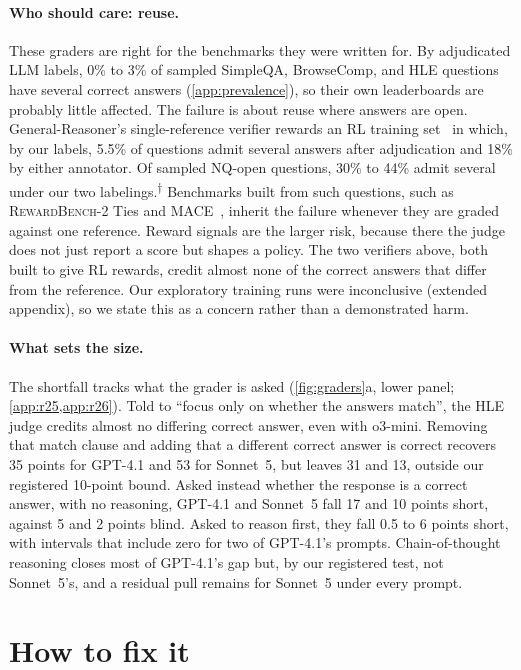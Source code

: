 \documentclass{article}
\newcommand{\ph}{\textsuperscript{$\dagger$}}
\begin{document}
\paragraph{Who should care: reuse.}
These graders are right for the benchmarks they were written for.
By adjudicated LLM labels, 0\% to 3\% of sampled SimpleQA, BrowseComp, and HLE questions have several correct answers (\cref{app:prevalence}), so their own leaderboards are probably little affected.
The failure is about reuse where answers are open.
General-Reasoner's single-reference verifier rewards an RL training set~\citep{ma2025generalreasoner} in which, by our labels, 5.5\% of questions admit several answers after adjudication and 18\% by either annotator.
Of sampled NQ-open questions, 30\% to 44\% admit several under our two labelings.\ph{}
Benchmarks built from such questions, such as \textsc{RewardBench-2} Ties and \textsc{MACE}~\citep{malik2025rewardbench2,mace2026}, inherit the failure whenever they are graded against one reference.
Reward signals are the larger risk, because there the judge does not just report a score but shapes a policy.
The two verifiers above, both built to give RL rewards, credit almost none of the correct answers that differ from the reference.
Our exploratory training runs were inconclusive (extended appendix), so we state this as a concern rather than a demonstrated harm.

\paragraph{What sets the size.}
The shortfall tracks what the grader is asked (\cref{fig:graders}a, lower panel; \cref{app:r25,app:r26}).
Told to ``focus only on whether the answers match'', the HLE judge credits almost no differing correct answer, even with o3-mini.
Removing that match clause and adding that a different correct answer is correct recovers 35 points for GPT-4.1 and 53 for Sonnet~5, but leaves 31 and 13, outside our registered 10-point bound.
Asked instead whether the response is a correct answer, with no reasoning, GPT-4.1 and Sonnet~5 fall 17 and 10 points short, against 5 and 2 points blind.
Asked to reason first, they fall 0.5 to 6 points short, with intervals that include zero for two of GPT-4.1's prompts.
Chain-of-thought reasoning closes most of GPT-4.1's gap but, by our registered test, not Sonnet~5's, and a residual pull remains for Sonnet~5 under every prompt.

\section{How to fix it}
\label{sec:fix}
\end{document}
